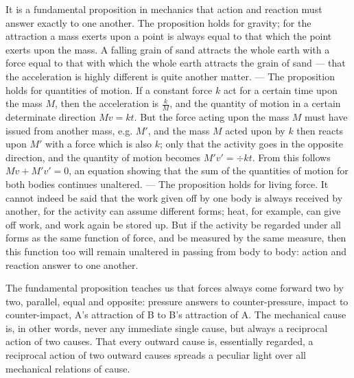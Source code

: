 \documentclass[12pt,a4paper]{book}
\begin{document}
It is a fundamental proposition in mechanics that action and reaction must answer exactly to
one another. The proposition holds for gravity; for the attraction a mass exerts upon a point is
always equal to that which the point exerts upon the mass. A falling grain of sand attracts the whole
earth with a force equal to that with which the whole earth attracts the grain of sand --- that the
acceleration is highly different is quite another matter. --- The proposition holds for quantities of
motion. If a constant force $k$ act for a certain time upon the mass $M$, then the acceleration is
$\frac{k}{M}$, and the quantity of motion in a certain determinate direction $Mv = kt$. But the force
acting upon the mass $M$ must have issued from another mass, e.g. $M'$, and the mass $M$ acted upon by
$k$ then reacts upon $M'$ with a force which is also $k$; only that the activity goes in the opposite
direction, and the quantity of motion becomes $M'v' = \div kt$. From this follows $Mv + M'v' = 0$, an
equation showing that the sum of the quantities of motion for both bodies continues unaltered. --- The
proposition holds for living force. It cannot indeed be said that the work given off by one body is
always received by another, for the activity can assume different forms; heat, for example, can give
off work, and work again be stored up. But if the activity be regarded under all forms as the same
function of force, and be measured by the same measure, then this
function too will remain unaltered in passing from body to body: action and reaction answer to one
another.

The fundamental proposition teaches us that forces always come forward two by two, parallel, equal and
opposite: pressure answers to counter-pressure, impact to counter-impact, A's attraction of B to B's
attraction of A. The mechanical cause is, in other words, never any immediate single cause, but always
a reciprocal action of two causes. That every outward cause is, essentially regarded, a reciprocal
action of two outward causes spreads a peculiar light over all mechanical relations of cause.
\end{document}
